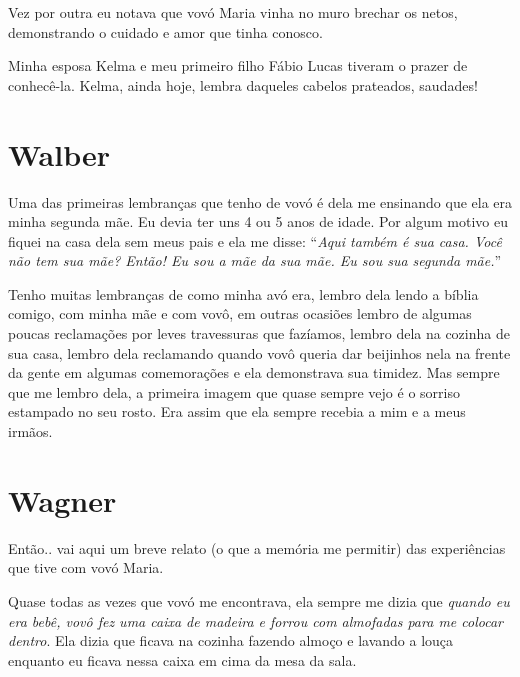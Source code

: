 \documentclass[
  brazil,
  a6paper,
  oneside,
  landscape,
  14pt]{scrbook}
\begin{document}
Vez por outra eu notava que vovó Maria vinha no muro brechar os netos,
demonstrando o cuidado e amor que tinha conosco.

Minha esposa Kelma e meu primeiro filho Fábio Lucas tiveram o prazer de
conhecê-la. Kelma, ainda hoje, lembra daqueles cabelos prateados,
saudades!

\hypertarget{walber}{%
\section{Walber}\label{walber}}

Uma das primeiras lembranças que tenho de vovó é dela me ensinando que
ela era minha segunda mãe. Eu devia ter uns 4 ou 5 anos de idade. Por
algum motivo eu fiquei na casa dela sem meus pais e ela me disse:
``\emph{Aqui também é sua casa. Você não tem sua mãe? Então! Eu sou a
mãe da sua mãe. Eu sou sua segunda mãe.}''

Tenho muitas lembranças de como minha avó era, lembro dela lendo a
bíblia comigo, com minha mãe e com vovô, em outras ocasiões lembro de
algumas poucas reclamações por leves travessuras que fazíamos, lembro
dela na cozinha de sua casa, lembro dela reclamando quando vovô queria
dar beijinhos nela na frente da gente em algumas comemorações e ela
demonstrava sua timidez. Mas sempre que me lembro dela, a primeira
imagem que quase sempre vejo é o sorriso estampado no seu rosto. Era
assim que ela sempre recebia a mim e a meus irmãos.

\hypertarget{wagner}{%
\section{Wagner}\label{wagner}}

Então.. vai aqui um breve relato (o que a memória me permitir) das
experiências que tive com vovó Maria.

Quase todas as vezes que vovó me encontrava, ela sempre me dizia que
\emph{quando eu era bebê, vovô fez uma caixa de madeira e forrou com
almofadas para me colocar dentro}. Ela dizia que ficava na cozinha
fazendo almoço e lavando a louça enquanto eu ficava nessa caixa em cima
da mesa da sala.
\end{document}
